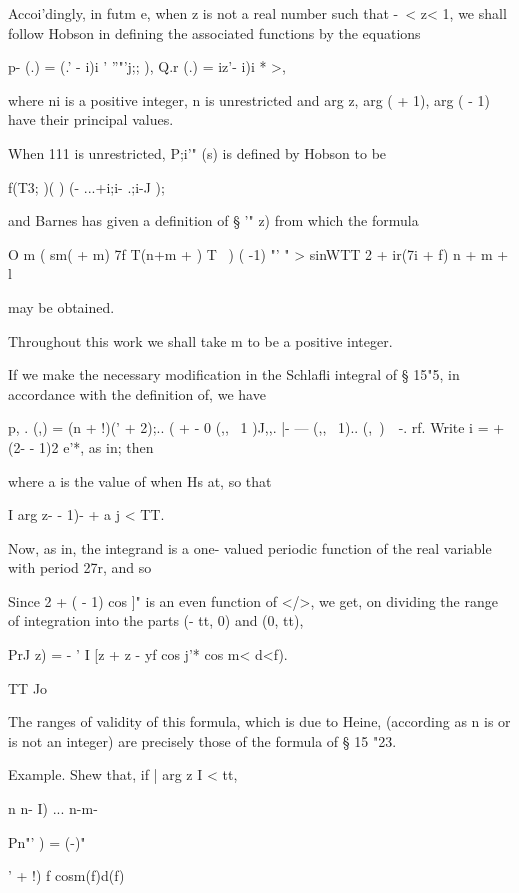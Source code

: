 {{{Accoi'dingly, in futm e, when z is not a real number such that -\ < z<
1, we shall follow Hobson in defining the associated functions by the
equations

p- (.) = (.' - i)i ' ''"'j;; ), Q.r (.) = iz'- i)i * >,

where ni is a positive integer, n is unrestricted and arg z, arg ( +
1), arg ( - 1) have their principal values.

%
%

When 111 is unrestricted, P;i'" (s) is defined by Hobson to be

f(T3; )( ) (- ...+i;i- .;i-J );

and Barnes has given a definition of § '" z) from which the formula

O m ( sm( + m) 7f T(n+m + ) T \ ) ( -1) "' " > sinWTT 2 + ir(7i + f) n
+ m + l

may be obtained.

Throughout this work we shall take m to be a positive integer.


If we make the necessary modification in the Schlafli integral of §
15"5, in accordance with the definition of, we have

p, . (,) = (n + !)(' + 2);.. ( + - 0 (,, \ 1 )J,,. |- --- (,, \ 1)..
(, \,)\ \ -. rf. Write i = + (2- - 1)2 e'*, as in; then

where a is the value of when Hs at, so that

I arg z- - 1)- + a j < TT.

Now, as in, the integrand is a one- valued periodic function
of the real variable with period 27r, and so

Since 2 + ( - 1) cos ]" is an even function of </>, we get, on
dividing the range of integration into the parts (- tt, 0) and (0,
tt),

PrJ z) = - ' I [z + z - yf cos j'* cos m< d<f).

TT Jo

The ranges of validity of this formula, which is due to Heine,
(according as n is or is not an integer) are precisely those of the
formula of § 15 "23.

Example. Shew that, if | arg z I < tt,

n n- I) ... n-m-

Pn"' ) = (-)"

' + !) f cosm(f)d(f)

}}}
